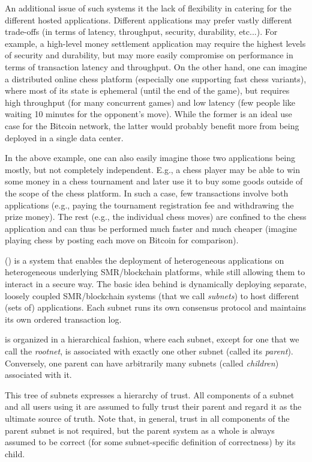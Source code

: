 An additional issue of such systems it the lack of flexibility in catering for the different hosted applications.
Different applications may prefer vastly different trade-offs (in terms of latency, throughput, security, durability, etc...).
For example, a high-level money settlement application may require the highest levels of security and durability, but may more easily compromise on performance in terms of transaction latency and throughput.
On the other hand, one can imagine a distributed online chess platform (especially one supporting fast chess variants), where most of its state is ephemeral (until the end of the game), but requires high throughput (for many concurrent games) and low latency (few people like waiting 10 minutes for the opponent's move).
While the former is an ideal use case for the Bitcoin network, the latter would probably benefit more from being deployed in a single data center.

In the above example, one can also easily imagine those two applications being mostly, but not completely independent.
E.g., a chess player may be able to win some money in a chess tournament and later use it to buy some goods outside of the scope of the chess platform.
In such a case, few transactions involve both applications (e.g., paying the tournament registration fee and withdrawing the prize money).
The rest (e.g., the individual chess moves) are confined to the chess application and can thus be performed much faster and much cheaper (imagine playing chess by posting each move on Bitcoin for comparison).

\nameFull (\nameAbbr) is a system that enables the deployment of heterogeneous applications on heterogeneous underlying SMR/blockchain platforms, while still allowing them to interact in a secure way.
The basic idea behind \nameAbbr is dynamically deploying separate, loosely coupled SMR/blockchain systems (that we call \emph{subnets}) to host different (sets of) applications.
Each subnet runs its own consensus protocol and maintains its own ordered transaction log.

\nameAbbr is organized in a hierarchical fashion, where each subnet, except for one that we call the \emph{rootnet}, is associated with exactly one other subnet (called its \emph{parent}).
Conversely, one parent can have arbitrarily many subnets (called \emph{children}) associated with it.

This tree of subnets expresses a hierarchy of trust.
All components of a subnet and all users using it are assumed to fully trust their parent and regard it as the ultimate source of truth.
Note that, in general, trust in all components of the parent subnet is not required, but the parent system as a whole is always assumed to be correct (for some subnet-specific definition of correctness) by its child.

